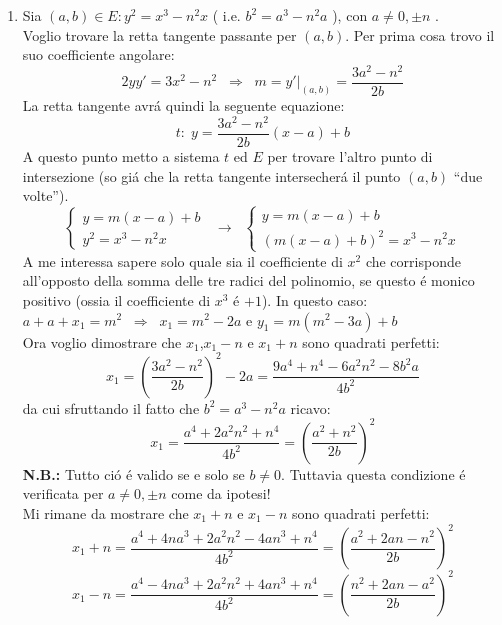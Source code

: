 \documentclass[a4paper]{article}
\newcommand{\sist}{\begin{cases}}
\newcommand{\esist}{\end{cases}}
\newcommand{\ds}{\displaystyle}
\begin{document}
\begin{enumerate}
\begin{enumerate}
\item Sia $(a,b)\in E: y^2=x^3-n^2x$ ( i.e. $b^2=a^3-n^2a$ ), con $a\neq 0,\pm n$ .\\
Voglio trovare la retta tangente passante per $(a,b)$. Per prima cosa trovo il suo coefficiente angolare:
$$2yy'=3x^2-n^2 \;\;\Rightarrow\;\; m=y'|_{(a,b)}=\ds{\frac{3a^2-n^2}{2b}}$$
La retta tangente avr\'a quindi la seguente equazione:
$$t:\; y=\ds{\frac{3a^2-n^2}{2b}\left(x-a\right)+b}$$ 
A questo punto metto a sistema $t$ ed $E$ per trovare l'altro punto di intersezione (so gi\'a che la retta tangente intersecher\'a il punto $(a,b)$ "`due volte"').\\
$$\sist
y=m(x-a)+b \\
y^2=x^3-n^2x
\esist\;\;\longrightarrow\;\;
\sist
y=m(x-a)+b\\
(m(x-a)+b)^2=x^3-n^2x
\esist$$
A me interessa sapere solo quale sia il coefficiente di $x^2$ che corrisponde all'opposto della somma delle tre radici del polinomio, se questo \'e monico positivo (ossia il coefficiente di $x^3$ \'e $+1$). In questo caso:
$a+a+x_1=m^2\;\;\Rightarrow\;\; x_1=m^2-2a$ e $y_1=m(m^2-3a)+b$\\
Ora voglio dimostrare che $x_1$,$x_1-n$ e $x_1+n$ sono quadrati perfetti:
$$x_1=\ds{\left(\frac{3a^2-n^2}{2b}\right)^2-2a=\frac{9a^4+n^4-6a^2n^2-8b^2a}{4b^2}}$$
da cui sfruttando il fatto che $b^2=a^3-n^2a$ ricavo:
$$x_1=\ds\frac{a^4+2a^2n^2+n^4}{4b^2}=\left(\frac{a^2+n^2}{2b}\right)^2$$
\textbf{N.B.:} Tutto ci\'o \'e valido se e solo se $b\neq 0$. Tuttavia questa condizione \'e verificata per 
$a\neq 0, \pm n$ come da ipotesi!\\
Mi rimane da mostrare che $x_1+n$ e $x_1-n$ sono quadrati perfetti:
$$x_1 +n=\ds{\frac{a^4+4na^3+2a^2n^2-4an^3+n^4}{4b^2}=\left(\frac{a^2+2an-n^2}{2b}\right)^2}$$
$$x_1 -n=\ds{\frac{a^4-4na^3+2a^2n^2+4an^3+n^4}{4b^2}=\left(\frac{n^2+2an-a^2}{2b}\right)^2}$$
\end{enumerate}


\end{enumerate}
\end{document}
